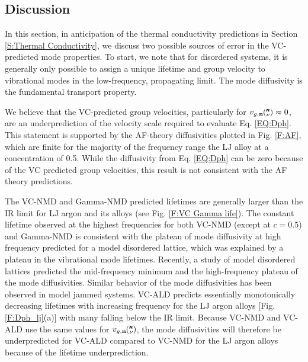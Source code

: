 \clearpage

\subsection{\label{S:Discussion}Discussion}

In this section, in anticipation of the thermal conductivity predictions 
in Section \ref{S:Thermal Conductivity}, we discuss two possible sources 
of error in the VC-predicted mode properties. 
To start, we note that for disordered systems, it is generally only 
possible to assign a 
unique lifetime and group velocity to vibrational modes  
in the low-frequency, propagating limit.
\cite{feldman_numerical_1999,xu_energy_2009} The mode diffusivity 
is the fundamental transport property.
\cite{allen_thermal_1993,feldman_thermal_1993,feldman_numerical_1999} 

We believe that the VC-predicted group velocities, particularly 
for $v_{g,\mathbf{n}}\mspace{-4.0mu}\left(\mspace{-8.0mu} \begin{smallmatrix}&\pmb{\kappa} \\&\nu \end{smallmatrix}\mspace{-3.0mu}\right) \approx 0$, are an underprediction of the 
velocity scale required to evaluate Eq. \eqref{EQ:Dph}.  
This statement is supported by the 
AF-theory diffusivities plotted in Fig. \ref{F:AF}, 
which are finite for the majority of the frequency range 
the LJ alloy at a concentration 
of 0.5. While the diffusivity from Eq. \eqref{EQ:Dph} can be 
zero because of the VC predicted group velocities, this result is not 
consistent with the AF theory predictions.

The VC-NMD and Gamma-NMD predicted lifetimes are generally larger 
than the IR limit  
for LJ argon and its alloys (see Fig. \ref{F:VC Gamma life}). 
The constant lifetime observed at the highest frequencies  
for both VC-NMD (except at $c=0.5$) and Gamma-NMD is 
consistent with the plateau of mode diffusivity at high 
frequency predicted for a model disordered lattice, 
which was explained by a plateau in the vibrational mode lifetimes.
\cite{sheng_heat_1991} Recently, a study of model disordered lattices 
predicted the mid-frequency minimum and the high-frequency plateau  
of the mode diffusivities.\cite{beltukov_ioffe_2013} Similar 
behavior of the mode diffusivities has been observed in model 
jammed systems.\cite{xu_energy_2009,vitelli_heat_2010} 
VC-ALD predicts essentially monotonically 
decreasing lifetimes with increasing frequency for the LJ argon 
alloys [Fig. \ref{F:Dph_lj}(a)] with many falling below the IR limit. 
Because VC-NMD and VC-ALD use the same values for 
$v_{g,\mathbf{n}}\mspace{-4.0mu}\left(\mspace{-8.0mu} \begin{smallmatrix}&\pmb{\kappa} \\&\nu \end{smallmatrix}\mspace{-3.0mu}\right)$, the 
mode diffusivities will therefore be underpredicted for 
VC-ALD compared to VC-NMD for the LJ argon alloys because of the 
lifetime underprediction. 

